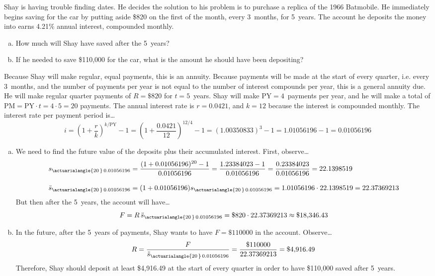 \documentclass[11pt,letterpaper]{article}
\begin{document}
\newpage



 Shay is having trouble finding dates. He decides the solution to his problem is to purchase a replica of the 1966 Batmobile. He immediately begins saving for the car by putting aside \$820 on the first of the month, every 3~months, for 5~years. The account he deposits the money into earns 4.21\% annual interest, compounded monthly. 
	\begin{enumerate}[(a)]
	\item How much will Shay have saved after the 5~years?
	\item If he needed to save \$110,000 for the car, what is the amount he should have been depositing? 
	\end{enumerate} \pspace

\sol Because Shay will make regular, equal payments, this is an annuity. Because payments will be made at the start of every quarter, i.e. every 3~months, and the number of payments per year is not equal to the number of interest compounds per year, this is a general annuity due. He will make regular quarter payments of $R= \$820$ for $t= 5$~years. Shay will make $\text{PY}= 4$~payments per year, and he will make a total of $\text{PM}= \text{PY} \cdot t= 4 \cdot 5= 20$ payments. The annual interest rate is $r= 0.0421$, and $k= 12$ because the interest is compounded monthly. The interest rate per payment period is\dots
	\[
	i= \left(1 + \dfrac{r}{k} \right)^{k/\text{PY}} - 1= \left(1 + \dfrac{0.0421}{12} \right)^{12/4} - 1= (1.00350833)^3 - 1= 1.01056196 - 1= 0.01056196
	\] \pspace

\begin{enumerate}[(a)]
\item We need to find the future value of the deposits plus their accumulated interest. First, observe\dots
	\[
	\begin{aligned}
	s_{\actuarialangle{20\,}\, 0.01056196}&= \dfrac{(1 + 0.01056196)^{20} - 1}{0.01056196}= \dfrac{1.23384023 - 1}{0.01056196}= \dfrac{0.23384023}{0.01056196}= 22.1398519 \\[0.3cm]
	\ddot{s}_{\actuarialangle{20\,}\, 0.01056196}&= (1 + 0.01056196) s_{\actuarialangle{20\,}\, 0.01056196}= 1.01056196 \cdot 22.1398519= 22.37369213
	\end{aligned}
	\]
But then after the 5~years, the account will have\dots
	\[
	F= R\, \ddot{s}_{\actuarialangle{20\,}\, 0.01056196}= \$820 \cdot 22.37369213 \approx \$18,\!346.43
	\] \pspace

\item In the future, after the 5~years of payments, Shay wants to have $F= \$110000$ in the account. Observe\dots
	\[
	R= \dfrac{F}{\ddot{s}_{\actuarialangle{20\,}\, 0.01056196}}= \dfrac{\$110000}{22.37369213}= \$4,\!916.49
	\]
Therefore, Shay should deposit at least \$4,916.49 at the start of every quarter in order to have \$110,000 saved after 5~years. 
\end{enumerate}
\end{document}
